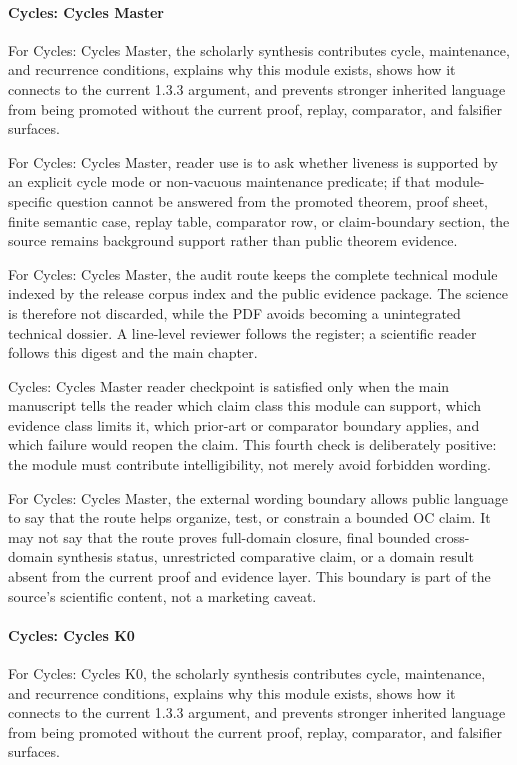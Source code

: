 \paragraph{Cycles: Cycles Master}

For Cycles: Cycles Master, the scholarly synthesis contributes cycle, maintenance, and recurrence conditions, explains why this module exists, shows how it connects to the current 1.3.3 argument, and prevents stronger inherited language from being promoted without the current proof, replay, comparator, and falsifier surfaces.


For Cycles: Cycles Master, reader use is to ask whether liveness is supported by an explicit cycle mode or non-vacuous maintenance predicate; if that module-specific question cannot be answered from the promoted theorem, proof sheet, finite semantic case, replay table, comparator row, or claim-boundary section, the source remains background support rather than public theorem evidence.


For Cycles: Cycles Master, the audit route keeps the complete technical module indexed by the release corpus index and the public evidence package. The science is therefore not discarded, while the PDF avoids becoming a unintegrated technical dossier. A line-level reviewer follows the register; a scientific reader follows this digest and the main chapter.


Cycles: Cycles Master reader checkpoint is satisfied only when the main manuscript tells the reader which claim class this module can support, which evidence class limits it, which prior-art or comparator boundary applies, and which failure would reopen the claim. This fourth check is deliberately positive: the module must contribute intelligibility, not merely avoid forbidden wording.


For Cycles: Cycles Master, the external wording boundary allows public language to say that the route helps organize, test, or constrain a bounded OC claim. It may not say that the route proves full-domain closure, final bounded cross-domain synthesis status, unrestricted comparative claim, or a domain result absent from the current proof and evidence layer. This boundary is part of the source's scientific content, not a marketing caveat.


\paragraph{Cycles: Cycles K0}

For Cycles: Cycles K0, the scholarly synthesis contributes cycle, maintenance, and recurrence conditions, explains why this module exists, shows how it connects to the current 1.3.3 argument, and prevents stronger inherited language from being promoted without the current proof, replay, comparator, and falsifier surfaces.


